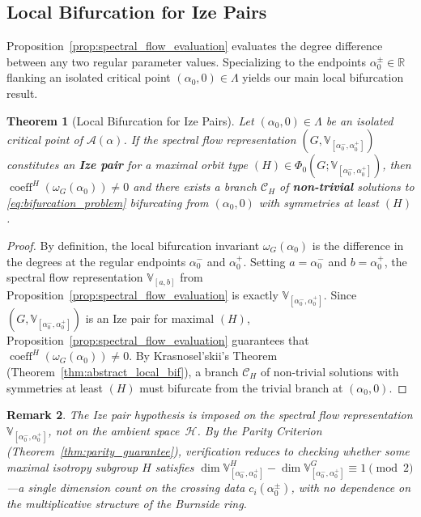\documentclass[twoside]{article}%
\def\br{\mathbb R}
\newtheorem{theorem}{Theorem}[section]
\newtheorem{remark}[theorem]{Remark}
\begin{document}
\subsection{Local Bifurcation for Ize Pairs}
\label{sec:local_bif_ize}
Proposition~\ref{prop:spectral_flow_evaluation} evaluates the degree difference between any two regular parameter values.  Specializing to the endpoints $\alpha_0^\pm \in \br$ flanking an isolated critical point $(\alpha_0,0) \in \Lambda$ yields our main local bifurcation result.
\begin{theorem}[Local Bifurcation for Ize Pairs]\label{thm:local_bif_ize}
Let $(\alpha_0,0) \in \Lambda$ be an isolated critical point of $\mathscr A(\alpha)$. If the spectral flow representation $(G, \mathbb V_{[\alpha_0^-,\alpha_0^+]})$ constitutes an \textbf{Ize pair} for a maximal orbit type $(H) \in \Phi_0(G; \mathbb V_{[\alpha_0^-,\alpha_0^+]})$, then $\operatorname{coeff}^H(\omega_G(\alpha_0)) \neq 0$ and there exists a branch $\mathscr C_H$ of \textbf{non-trivial} solutions to \eqref{eq:bifurcation_problem} bifurcating from $(\alpha_0,0)$ with symmetries at least $(H)$.
\end{theorem}
\begin{proof}
By definition, the local bifurcation invariant $\omega_G(\alpha_0)$ is the difference in the degrees at the regular endpoints $\alpha_0^-$ and $\alpha_0^+$. Setting $a = \alpha_0^-$ and $b = \alpha_0^+$, the spectral flow representation $\mathbb V_{[a,b]}$ from Proposition~\ref{prop:spectral_flow_evaluation} is exactly $\mathbb V_{[\alpha_0^-,\alpha_0^+]}$. Since $(G, \mathbb V_{[\alpha_0^-,\alpha_0^+]})$ is an Ize pair for maximal $(H)$, Proposition~\ref{prop:spectral_flow_evaluation} guarantees that $\operatorname{coeff}^H(\omega_G(\alpha_0)) \neq 0$. By Krasnosel'skii's Theorem (Theorem~\ref{thm:abstract_local_bif}), a branch $\mathscr C_H$ of non-trivial solutions with symmetries at least $(H)$ must bifurcate from the trivial branch at $(\alpha_0, 0)$.
\end{proof}
\begin{remark}\rm
The Ize pair hypothesis is imposed on the spectral flow representation $\mathbb V_{[\alpha_0^-,\alpha_0^+]}$, not on the ambient
space~$\mathscr H$.  By the Parity Criterion
(Theorem~\ref{thm:parity_guarantee}), verification reduces to checking whether some maximal isotropy subgroup $H$ satisfies $\dim\mathbb V_{[\alpha_0^-,\alpha_0^+]}^H - \dim\mathbb V_{[\alpha_0^-,\alpha_0^+]}^G \equiv 1 \pmod{2}$---a
single dimension count on the crossing data $c_i(\alpha_0^\pm)$, with no dependence on the multiplicative structure of the Burnside ring.
\end{remark}
\end{document}
